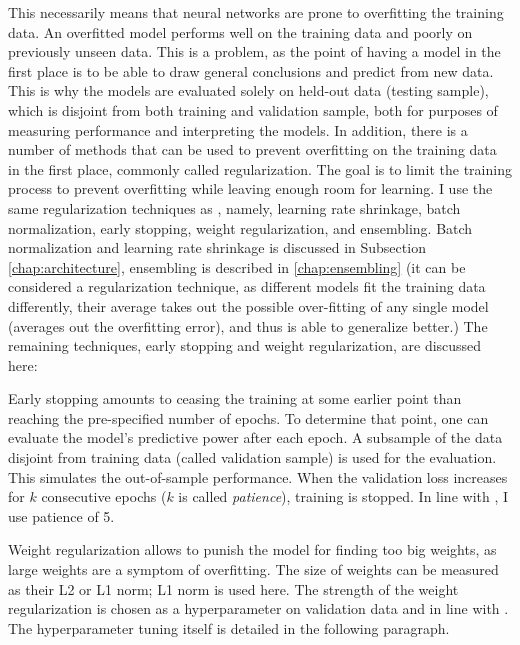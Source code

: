 		This necessarily means that neural networks are prone to overfitting the training data. An overfitted model performs well on the training data and poorly on previously unseen data. This is a problem, as the point of having a model in the first place is to be able to draw general conclusions and predict from new data. This is why the models are evaluated solely on held-out data (testing sample), which is disjoint from both training and validation sample, both for purposes of measuring performance and interpreting the models. In addition, there is a number of methods that can be used to prevent overfitting on the training data in the first place, commonly called regularization. The goal is to limit the training process to prevent overfitting while leaving enough room for learning. I use the same regularization techniques as \cite{gu2020empirical}, namely, learning rate shrinkage, batch normalization, early stopping, weight regularization, and ensembling. Batch normalization and learning rate shrinkage is discussed in Subsection \ref{chap:architecture}, ensembling is described in \ref{chap:ensembling} (it can be considered a regularization technique, as different models fit the training data differently, their average takes out the possible over-fitting of any single model (averages out the overfitting error), and thus is able to generalize better.) The remaining techniques, early stopping and weight regularization, are discussed here: 
		
		Early stopping amounts to ceasing the training at some earlier point than reaching the pre-specified number of epochs. To determine that point, one can evaluate the model's predictive power after each epoch. A subsample of the data disjoint from training data (called validation sample) is used for the evaluation. This simulates the out-of-sample performance. When the validation loss increases for $k$ consecutive epochs ($k$ is called \textit{patience}), training is stopped. In line with \cite{gu2020empirical}, I use patience of 5. 
		
		Weight regularization allows to punish the model for finding too big weights, as large weights are a symptom of overfitting. The size of weights can be measured as their L2 or L1 norm; L1 norm is used here. The strength of the weight regularization is chosen as a hyperparameter on validation data and in line with \cite{gu2020empirical}. The hyperparameter tuning itself is detailed in the following paragraph.
		
